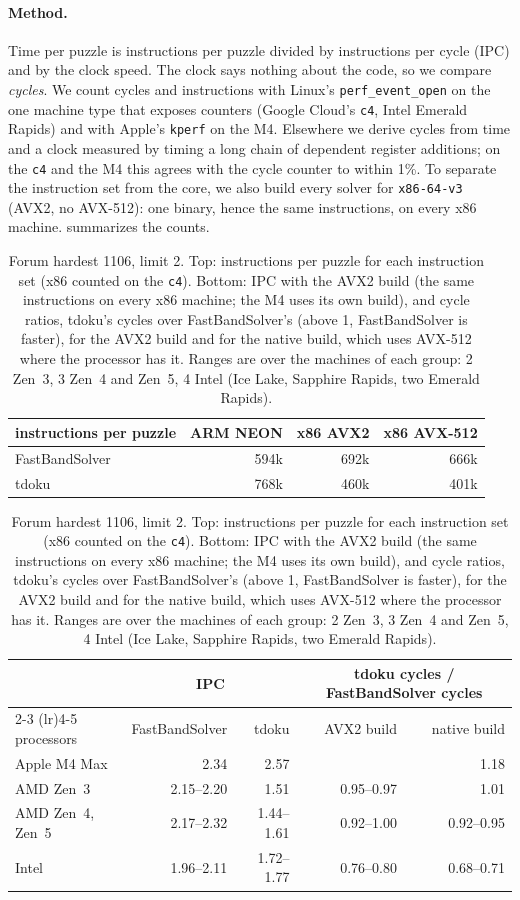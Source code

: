 \documentclass[11pt]{article}
\theoremstyle{definition}
\theoremstyle{plain}
\begin{document}
\paragraph{Method.} Time per puzzle is instructions per puzzle divided by instructions per cycle (IPC) and by the clock
speed. The clock says nothing about the code, so we compare \emph{cycles}. We count cycles and instructions with Linux's
\texttt{perf\_event\_open} on the one machine type that exposes counters (Google Cloud's \texttt{c4}, Intel Emerald
Rapids) and with Apple's \texttt{kperf} on the M4. Elsewhere we derive cycles from time and a clock measured by timing a
long chain of dependent register additions; on the \texttt{c4} and the M4 this agrees with the cycle counter to within
1\%. To separate the instruction set from the core, we also build every solver for \texttt{x86-64-v3} (AVX2, no
AVX-512): one binary, hence the same instructions, on every x86 machine.  summarizes the counts.

\begin{table}[t]
\centering
\caption{Forum hardest 1106, limit 2. Top: instructions per puzzle for each instruction set (x86 counted on the
\texttt{c4}). Bottom: IPC with the AVX2 build (the same instructions on every x86 machine; the M4 uses its own build),
and cycle ratios, tdoku's cycles over FastBandSolver's (above 1, FastBandSolver is faster), for the AVX2 build and for
the native build, which uses AVX-512 where the processor has it. Ranges are over the machines of each group: 2 Zen~3,
3 Zen~4 and Zen~5, 4 Intel (Ice Lake, Sapphire Rapids, two Emerald Rapids).}
\label{tab:cycles}
\small
\begin{tabular}{lrrr}
\toprule
instructions per puzzle & ARM NEON & x86 AVX2 & x86 AVX-512 \\
\midrule
FastBandSolver & 594k & 692k & 666k \\
tdoku & 768k & 460k & 401k \\
\bottomrule
\end{tabular}

\medskip
\begin{tabular}{lrrrr}
\toprule
& \multicolumn{2}{c}{IPC} & \multicolumn{2}{c}{tdoku cycles / FastBandSolver cycles} \\
\cmidrule(lr){2-3} \cmidrule(lr){4-5}
processors & FastBandSolver & tdoku & AVX2 build & native build \\
\midrule
Apple M4 Max & 2.34 & 2.57 & & 1.18 \\
AMD Zen~3 & 2.15--2.20 & 1.51 & 0.95--0.97 & 1.01 \\
AMD Zen~4, Zen~5 & 2.17--2.32 & 1.44--1.61 & 0.92--1.00 & 0.92--0.95 \\
Intel & 1.96--2.11 & 1.72--1.77 & 0.76--0.80 & 0.68--0.71 \\
\bottomrule
\end{tabular}
\end{table}
\end{document}
